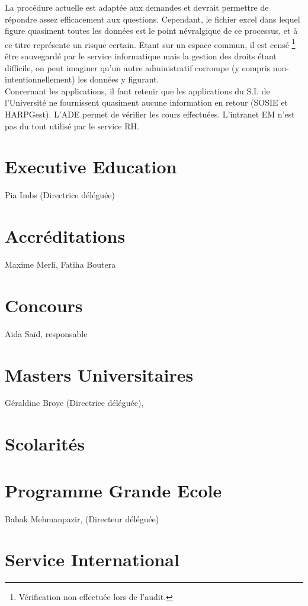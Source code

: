 \documentclass{book}
\begin{document}
La procédure actuelle est adaptée aux demandes et devrait permettre de 
répondre assez efficacement aux questions. Cependant, le fichier excel
dans lequel figure quasiment toutes les données est le point névralgique
de ce processus, et à ce titre représente un risque certain. Etant sur
un espace commun, il est censé%
\footnote{Vérification non effectuée lors de l'audit.}
être sauvegardé par le service informatique mais la gestion des droits
étant difficile, on peut imaginer qu'un autre administratif corrompe 
(y compris non-intentionnellement) les données y figurant.\\

Concernant les applications, il faut retenir que les applications
du S.I. de l'Université ne fournissent quasiment aucune information en
retour (SOSIE et HARPGest). L'ADE permet de vérifier les cours effectuées.
L'intranet EM n'est pas du tout utilisé par le service RH.
 

\section{Executive Education }
Pia Imbs (Directrice déléguée)

\section{Accréditations}
Maxime Merli, Fatiha Boutera

\section{Concours }
Aida Saïd, responsable

\section{Masters Universitaires}
Géraldine Broye (Directrice déléguée),

 
\section{Scolarités}

\section{Programme Grande Ecole}
Babak Mehmanpazir, (Directeur déléguée)

\section{Service International}
\end{document}
